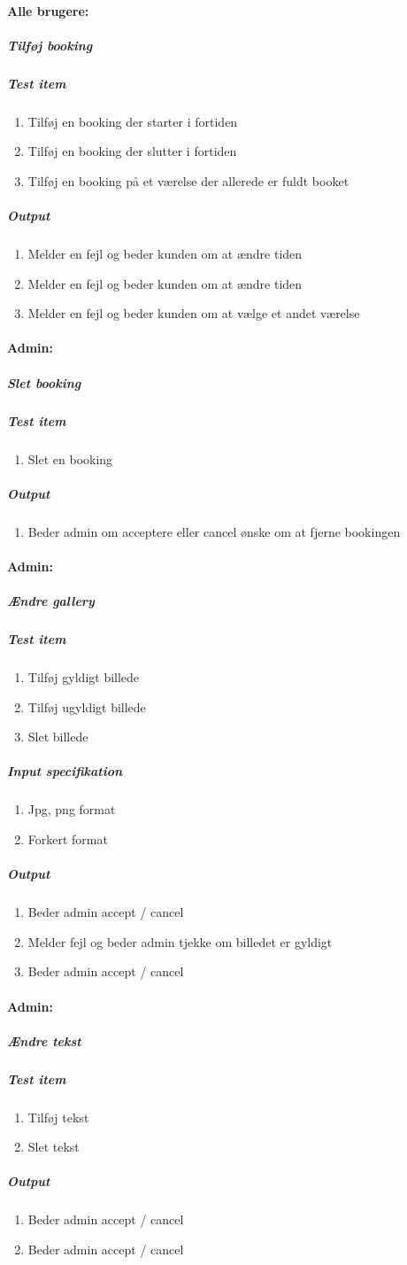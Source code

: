 \documentclass[12pt,a4paper]{article}
\begin{document}
\paragraph{Alle brugere:}
\subparagraph{Tilføj booking}
\subparagraph{Test item}
\begin{enumerate}
\item Tilføj en booking der starter i fortiden
\item Tilføj en booking der slutter i fortiden
\item Tilføj en booking på et værelse der allerede er fuldt booket
\end{enumerate}
\subparagraph{Output}
\begin{enumerate}
\item Melder en fejl og beder kunden om at ændre tiden
\item Melder en fejl og beder kunden om at ændre tiden
\item Melder en fejl og beder kunden om at vælge et andet værelse
\end{enumerate}
\paragraph{Admin:}
\subparagraph{Slet booking}
\subparagraph{Test item}
\begin{enumerate}
\item Slet en booking
\end{enumerate}
\subparagraph{Output}
\begin{enumerate}
\item Beder admin om acceptere eller cancel ønske om at fjerne bookingen
\end{enumerate}
\paragraph{Admin:}
\subparagraph{Ændre gallery}
\subparagraph{Test item}
\begin{enumerate}
\item Tilføj gyldigt billede
\item Tilføj ugyldigt billede
\item Slet billede
\end{enumerate}
\subparagraph{Input specifikation}
\begin{enumerate}
\item Jpg, png format
\item Forkert format
\end{enumerate}
\subparagraph{Output}
\begin{enumerate}
\item Beder admin accept / cancel
\item Melder fejl og beder admin tjekke om billedet er gyldigt
\item Beder admin accept / cancel
\end{enumerate}
\paragraph{Admin:}
\subparagraph{Ændre tekst}
\subparagraph{Test item}
\begin{enumerate}
\item Tilføj tekst
\item Slet tekst
\end{enumerate}
\subparagraph{Output}
\begin{enumerate}
\item Beder admin accept / cancel
\item Beder admin accept / cancel
\end{enumerate}
\end{document}
